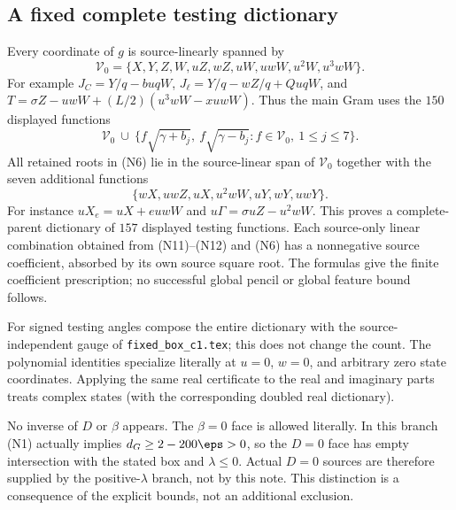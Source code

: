 \subsection{A fixed complete testing dictionary}

Every coordinate of $g$ is source-linearly spanned by
\[
 \mathcal V_0=\{X,Y,Z,W,uZ,wZ,uW,uwW,u^2W,u^3wW\}.       \tag{N13}
\]
For example $J_C=Y/q-buqW$, $J_\ell=Y/q-wZ/q+QuqW$,
and $T=\sigma Z-uwW+(L/2)(u^3wW-xuwW)$.
Thus the main Gram uses the $150$ displayed functions
\[
 \mathcal V_0\ \cup\
 \{f\sqrt{\gamma+b_j},\ f\sqrt{\gamma-b_j}:
                         f\in\mathcal V_0,\ 1\le j\le7\}.      \tag{N14}
\]
All retained roots in (N6) lie in the source-linear span of
$\mathcal V_0$ together with the seven additional functions
\[
       \{wX,uwZ,uX,u^2wW,uY,wY,uwY\}.                     \tag{N15}
\]
For instance $uX_e=uX+euwW$ and
$u\Gamma=\sigma uZ-u^2wW$. This proves a complete-parent
dictionary of $157$ displayed testing functions. Each source-only
linear combination obtained from (N11)--(N12) and (N6) has a
nonnegative source coefficient, absorbed by its own source square
root. The formulas give the finite coefficient prescription; no
successful global pencil or global feature bound follows.

For signed testing angles compose the entire dictionary with the
source-independent gauge of \texttt{fixed\_box\_c1.tex}; this does
not change the count. The polynomial identities specialize literally
at $u=0$, $w=0$, and arbitrary zero state coordinates. Applying
the same real certificate to the real and imaginary parts treats
complex states (with the corresponding doubled real dictionary).

No inverse of $D$ or $\beta$ appears. The $\beta=0$ face is allowed
literally. In this branch (N1) actually implies
$d_G\ge2-200\eps>0$, so the $D=0$ face has empty intersection
with the stated box and $\lambda\le0$. Actual $D=0$ sources are
therefore supplied by the positive-$\lambda$ branch, not by this note.
This distinction is a consequence of the explicit bounds, not an
additional exclusion.

